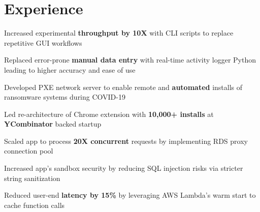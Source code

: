 \documentclass[]{deedy-resume-openfont}
\begin{document}
%
%

%
%



\section{Experience}

\begin{tightemize}
				\item Increased experimental \textbf{throughput by 10X} with CLI scripts to replace repetitive GUI workflows %
				\item Replaced error-prone \textbf{manual data entry} with real-time activity logger Python leading to higher accuracy and ease of use
				\item Developed PXE network server to enable remote and \textbf{automated} installs of ransomware systems  during COVID-19
\end{tightemize}
\sectionsep

\begin{tightemize}
\item Led re-architecture of Chrome extension with \textbf{10,000+ installs} at \textbf{YCombinator} backed startup
				\item Scaled app to process \textbf{20X concurrent} requests by implementing RDS proxy connection pool %
\item Increased app's sandbox security by reducing SQL injection risks via stricter string sanitization
\item Reduced user-end \textbf{latency by 15\%} by leveraging AWS Lambda's warm start to cache function calls 
\end{tightemize}
\sectionsep
\end{document}
